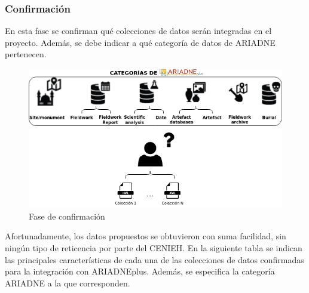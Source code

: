 \documentclass[
]{article}
\begin{document}
\hypertarget{confirmaciuxf3n}{%
\subsubsection{Confirmación}\label{confirmaciuxf3n}}

En esta fase se confirman qué colecciones de datos serán integradas en
el proyecto. Además, se debe indicar a qué categoría de datos de ARIADNE
pertenecen.

\begin{figure}
\hypertarget{categoriesARIADNE}{%
\centering
\includegraphics{../_static/images/categoriesARIADNE.png}
\caption{Fase de confirmación}\label{categoriesARIADNE}
}
\end{figure}

Afortunadamente, los datos propuestos se obtuvieron con suma facilidad,
sin ningún tipo de reticencia por parte del CENIEH. En la siguiente
tabla se indican las principales características de cada una de las
colecciones de datos confirmadas para la integración con ARIADNEplus.
Además, se especifica la categoría ARIADNE a la que corresponden.
\end{document}
